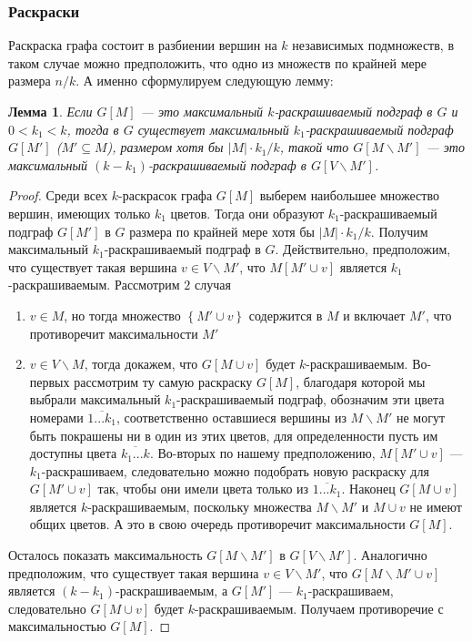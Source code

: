 \documentclass[12pt]{article}
\newtheorem{lemma}{Лемма}
\begin{document}
\subsubsection{Раскраски}
Раскраска графа состоит в разбиении вершин на $k$ независимых подмножеств, в таком случае можно предположить, что одно из множеств по крайней мере размера $n/k$. А именно сформулируем следующую лемму:
\begin{lemma}\label{lm:madsen}
Если $G\left[M\right]$ --- это максимальный $k$-раскрашиваемый подграф в $G$ и $0 < k_1 < k$, тогда в $G$ существует максимальный $k_1$-раскрашиваемый подграф $G\left[M'\right]$ ($M' \subseteq M$), размером хотя бы $\left|M\right|\cdot k_1/k$, такой что $G\left[M \backslash M'\right]$ --- это максимальный $\left(k - k_1\right)$-раскрашиваемый подграф в $G\left[V \backslash M'\right]$.
\end{lemma}
\begin{proof}
Среди всех $k$-раскрасок графа $G\left[M\right]$ выберем наибольшее множество вершин, имеющих только $k_1$ цветов. Тогда они образуют $k_1$-раскрашиваемый подграф $G\left[M'\right]$ в $G$ размера по крайней мере хотя бы $\left|M\right| \cdot k_1/k$. Получим максимальный $k_1$-раскрашиваемый подграф в $G$. Действительно, предположим, что существует такая вершина $v \in V \backslash M'$, что $M\left[M' \cup v\right]$ является $k_1$-раскрашиваемым. Рассмотрим $2$ случая 
	\begin{enumerate}
		\item $v \in M$, но тогда множество $\left\{M' \cup v\right\}$ содержится в $M$ и включает $M'$, что про\-ти\-во\-ре\-чит максимальности $M'$
		\item $v \in V \backslash M$, тогда докажем, что $G\left[M \cup v\right]$ будет $k$-раскрашиваемым. Во-первых рассмотрим ту самую раскраску $G\left[M\right]$, благодаря которой мы выбрали ма\-кси\-ма\-льный $k_1$-раскрашиваемый подграф, обозначим эти цвета номерами $\overline{1...k_1}$, со\-от\-вет\-ствен\-но оставшиеся вершины из $M \backslash M'$ не могут быть покрашены ни в один из этих цветов, для определенности пусть им доступны цвета $\overline{k_1...k}$. Во-вторых по нашему предположению, $M\left[M' \cup v\right]$ --- $k_1$-раскрашиваем, следовательно можно подобрать новую раскраску для $G\left[M'\cup v\right]$ так, чтобы они имели цвета только из $\overline{1...k_1}$. Наконец $G\left[M \cup v\right]$ является $k$-раскрашиваемым, поскольку множества $M \backslash M'$ и $M \cup v$  не имеют общих цветов. А это в свою очередь противоречит максимальности $G\left[M\right]$.
	\end{enumerate} 
	Осталось показать максимальность $G\left[M \backslash M'\right]$ в $G\left[V \backslash M'\right]$. Аналогично предположим, что существует такая вершина $v \in V \backslash M'$, что $G\left[M \backslash M' \cup v\right]$ является $\left(k - k_1\right)$-рас\-кра\-ши\-ва\-е\-мым, а $G\left[M'\right]$ --- $k_1$-раскрашиваем, следовательно $G\left[M \cup v\right]$ будет $k$-рас\-кра\-ши\-ва\-е\-мым. Получаем противоречие с максимальностью $G\left[M\right]$.
\end{proof}
\end{document}
